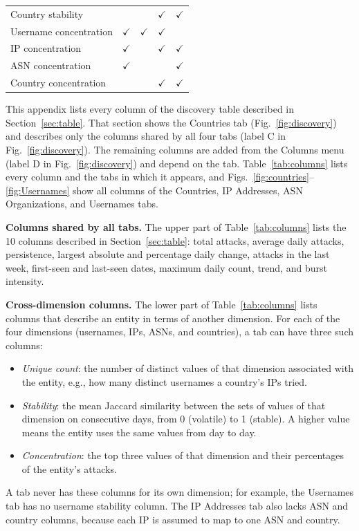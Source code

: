\documentclass[conference]{IEEEtran}
\newcommand{\ui}[1]{{\sffamily\hyphenchar\font=-1 #1}}
\begin{document}
\begin{table}[t]
\begin{tabular}{@{}lcccc@{}}
    Country stability              &              &              & $\checkmark$ & $\checkmark$ \\
    Username concentration         & $\checkmark$ & $\checkmark$ & $\checkmark$ &              \\
    IP concentration               & $\checkmark$ &              & $\checkmark$ & $\checkmark$ \\
    ASN concentration              & $\checkmark$ &              &              & $\checkmark$ \\
    Country concentration          &              &              & $\checkmark$ & $\checkmark$ \\
    \bottomrule
  \end{tabular}
\end{table}

This appendix lists every column of the discovery table described in
Section~\ref{sec:table}. That section shows the \ui{Countries} tab
(Fig.~\ref{fig:discovery}) and describes only the columns shared by all
four tabs (label C in Fig.~\ref{fig:discovery}). The remaining columns are added from the \ui{Columns}
menu (label D in Fig.~\ref{fig:discovery}) and depend on the tab. Table~\ref{tab:columns} lists every
column and the tabs in which it appears, and
Figs.~\ref{fig:countries}--\ref{fig:Usernames} show all columns of the
\ui{Countries}, \ui{IP Addresses}, \ui{ASN Organizations}, and \ui{Usernames} tabs.

\textbf{Columns shared by all tabs.} The upper part of
Table~\ref{tab:columns} lists the 10 columns described in
Section~\ref{sec:table}: total attacks, average daily attacks,
persistence, largest absolute and percentage daily change, attacks in
the last week, first-seen and last-seen dates, maximum daily
count, trend, and burst intensity.

\textbf{Cross-dimension columns.} The lower part of
Table~\ref{tab:columns} lists columns that describe an entity in terms of
another dimension. For each of the four dimensions (usernames, IPs, ASNs,
and countries), a tab can have three such columns:
\begin{itemize}
  \item \emph{Unique count}: the number of distinct values of that
  dimension associated with the entity, e.g., how many distinct usernames
  a country's IPs tried.
  \item \emph{Stability}: the mean Jaccard similarity between the sets of 
  values of that dimension on consecutive days, from 0 (volatile) to 1 (stable). A higher
  value means the entity uses the same values from day to day.
  \item \emph{Concentration}: the top three values of that dimension and
  their percentages of the entity's attacks.
\end{itemize}
A tab never has these columns for its own dimension; for example, the
\ui{Usernames} tab has no username stability column. The \ui{IP Addresses} tab also 
lacks ASN and country columns, because each IP is assumed to map to one ASN and country.
\end{document}
